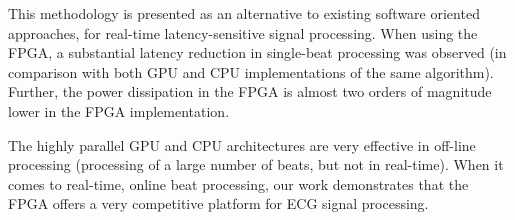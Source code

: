 \documentclass[runningheads]{llncs}
\begin{document}
This methodology is presented as an alternative to existing software oriented approaches, 
for real-time latency-sensitive signal processing. When using the FPGA, a substantial
latency reduction in single-beat processing was observed (in comparison with both
GPU and CPU implementations of the same algorithm).  
Further, the power dissipation in
the FPGA is almost two orders of magnitude lower in the FPGA implementation.

The highly parallel GPU and CPU architectures are very effective in off-line processing
(processing of a large number of beats, but not in real-time).  When it comes to real-time,
online beat processing, our work demonstrates that the FPGA offers a very competitive 
platform for ECG signal processing.

 


\end{document}
